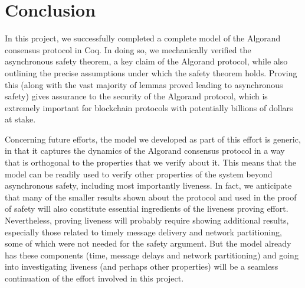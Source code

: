 \section{Conclusion}
\label{sec:conclusion}

In this project, we successfully completed a complete model of the Algorand consensus protocol in Coq. In doing so, we mechanically verified the asynchronous safety theorem, a key claim of the Algorand protocol, while also outlining the precise assumptions under which the safety theorem holds. Proving this (along with the vast majority of lemmas proved leading to asynchronous safety) gives assurance to the security of the Algorand protocol, which is extremely important for blockchain protocols with potentially billions of dollars at stake.

Concerning future efforts, the model we developed as part of this effort is generic, in that it captures the dynamics of the Algorand consensus protocol in a way that is orthogonal to the properties that we verify about it. This means that the model can be readily used to verify other properties of the system beyond asynchronous safety, including most importantly liveness. In fact, we anticipate that many of the smaller results shown about the protocol and used in the proof of safety will also constitute essential ingredients of the liveness proving effort. Nevertheless, proving liveness will probably require showing additional results, especially those related to timely message delivery and network partitioning, some of which were not needed for the safety argument. But the model already has these components (time, message delays and network partitioning) and going into investigating liveness (and perhaps other properties) will be a seamless continuation of the effort involved in this project.
